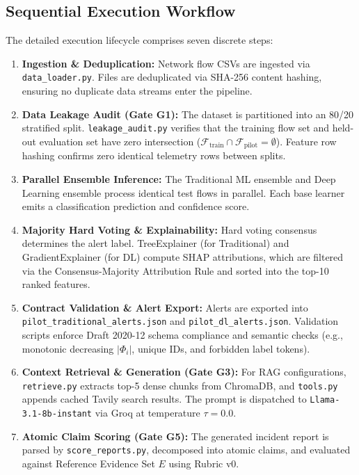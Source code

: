 \documentclass[conference]{IEEEtran}
\begin{document}
\subsection{Sequential Execution Workflow}
The detailed execution lifecycle comprises seven discrete steps:
\begin{enumerate}
    \item \textbf{Ingestion \& Deduplication:} Network flow CSVs are ingested via \texttt{data\_loader.py}. Files are deduplicated via SHA-256 content hashing, ensuring no duplicate data streams enter the pipeline.
    \item \textbf{Data Leakage Audit (Gate G1):} The dataset is partitioned into an 80/20 stratified split. \texttt{leakage\_audit.py} verifies that the training flow set and held-out evaluation set have zero intersection ($\mathcal{F}_{\text{train}} \cap \mathcal{F}_{\text{pilot}} = \emptyset$). Feature row hashing confirms zero identical telemetry rows between splits.
    \item \textbf{Parallel Ensemble Inference:} The Traditional ML ensemble and Deep Learning ensemble process identical test flows in parallel. Each base learner emits a classification prediction and confidence score.
    \item \textbf{Majority Hard Voting \& Explainability:} Hard voting consensus determines the alert label. TreeExplainer (for Traditional) and GradientExplainer (for DL) compute SHAP attributions, which are filtered via the Consensus-Majority Attribution Rule and sorted into the top-10 ranked features.
    \item \textbf{Contract Validation \& Alert Export:} Alerts are exported into \texttt{pilot\_traditional\_alerts.json} and \texttt{pilot\_dl\_alerts.json}. Validation scripts enforce Draft 2020-12 schema compliance and semantic checks (e.g., monotonic decreasing $|\Phi_i|$, unique IDs, and forbidden label tokens).
    \item \textbf{Context Retrieval \& Generation (Gate G3):} For RAG configurations, \texttt{retrieve.py} extracts top-5 dense chunks from ChromaDB, and \texttt{tools.py} appends cached Tavily search results. The prompt is dispatched to \texttt{Llama-3.1-8b-instant} via Groq at temperature $\tau=0.0$.
    \item \textbf{Atomic Claim Scoring (Gate G5):} The generated incident report is parsed by \texttt{score\_reports.py}, decomposed into atomic claims, and evaluated against Reference Evidence Set $E$ using Rubric v0.
\end{enumerate}
\end{document}
